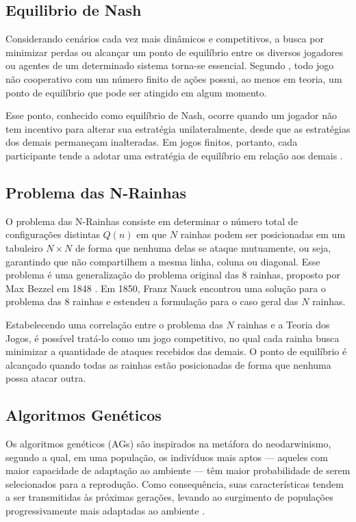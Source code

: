 \documentclass[
	article,			%
	11pt,				%
	oneside,			%
	a4paper,			%
	english,			%
	brazil,				%
	sumario=tradicional
	]{abntex2}
\begin{document}
\subsection{Equilibrio de Nash}

Considerando cenários cada vez mais dinâmicos e competitivos, a busca por minimizar perdas ou alcançar um ponto de equilíbrio entre os diversos jogadores ou agentes de um determinado sistema torna-se essencial. Segundo , todo jogo não cooperativo com um número finito de ações possui, ao menos em teoria, um ponto de equilíbrio que pode ser atingido em algum momento.

Esse ponto, conhecido como equilíbrio de Nash, ocorre quando um jogador não tem incentivo para alterar sua estratégia unilateralmente, desde que as estratégias dos demais permaneçam inalteradas. Em jogos finitos, portanto, cada participante tende a adotar uma estratégia de equilíbrio em relação aos demais \cite{nash1951noncooperative}.

\subsection{Problema das N-Rainhas}
O problema das N-Rainhas consiste em determinar o número total de configurações distintas \( Q(n) \) em que \( N \) rainhas podem ser posicionadas em um tabuleiro \( N \times N \) de forma que nenhuma delas se ataque mutuamente, ou seja, garantindo que não compartilhem a mesma linha, coluna ou diagonal. Esse problema é uma generalização do problema original das 8 rainhas, proposto por Max Bezzel em 1848 \cite{glock2022nqueens}. Em 1850, Franz Nauck  encontrou uma solução para o problema das 8 rainhas e estendeu a formulação para o caso geral das \( N \) rainhas.

Estabelecendo uma correlação entre o problema das \( N \) rainhas e a Teoria dos Jogos, é possível tratá-lo como um jogo competitivo, no qual cada rainha busca minimizar a quantidade de ataques recebidos das demais. O ponto de equilíbrio é alcançado quando todas as rainhas estão posicionadas de forma que nenhuma possa atacar outra.

\subsection{Algoritmos Genéticos}
Os algoritmos genéticos (AGs) são inspirados na metáfora do neodarwinismo, segundo a qual, em uma população, os indivíduos mais aptos — aqueles com maior capacidade de adaptação ao ambiente — têm maior probabilidade de serem selecionados para a reprodução. Como consequência, suas características tendem a ser transmitidas às próximas gerações, levando ao surgimento de populações progressivamente mais adaptadas ao ambiente \cite{mitchell1998genetic}.
\end{document}
